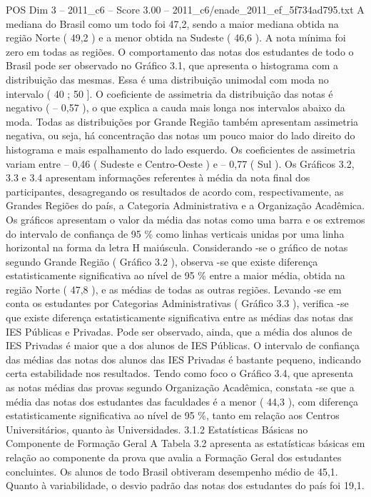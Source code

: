 \begin{textsample}{POS Dim 3 – 2011\_c6 – Score 3.00 – 2011\_c6/enade\_2011\_ef\_5f734ad795.txt}
A mediana do Brasil como um todo foi 47,2, sendo a maior mediana obtida na região Norte ( 49,2 ) e a menor obtida na Sudeste ( 46,6 ).
A nota mínima foi zero em todas as regiões.
O comportamento das notas dos estudantes de todo o Brasil pode ser observado no Gráfico 3.1, que apresenta o histograma com a distribuição das mesmas.
Essa é uma distribuição unimodal com moda no intervalo ( 40 ; 50 ].
O coeficiente de assimetria da distribuição das notas é negativo ( – 0,57 ), o que explica a cauda mais longa nos intervalos abaixo da moda.
Todas as distribuições por Grande Região também apresentam assimetria negativa, ou seja, há concentração das notas um pouco maior do lado direito do histograma e mais espalhamento do lado esquerdo.
Os coeficientes de assimetria variam entre – 0,46 ( Sudeste e Centro-Oeste ) e – 0,77 ( Sul ).
Os Gráficos 3.2, 3.3 e 3.4 apresentam informações referentes à média da nota final dos participantes, desagregando os resultados de acordo com, respectivamente, as Grandes Regiões do país, a Categoria Administrativa e a Organização Acadêmica.
Os gráficos apresentam o valor da média das notas como uma barra e os extremos do intervalo de confiança de 95 \% como linhas verticais unidas por uma linha horizontal na forma da letra H maiúscula.
Considerando -se o gráfico de notas segundo Grande Região ( Gráfico 3.2 ), observa -se que existe diferença estatisticamente significativa ao nível de 95 \% entre a maior média, obtida na região Norte ( 47,8 ), e as médias de todas as outras regiões.
Levando -se em conta os estudantes por Categorias Administrativas ( Gráfico 3.3 ), verifica -se que existe diferença estatisticamente significativa entre as médias das notas das IES Públicas e Privadas.
Pode ser observado, ainda, que a média dos alunos de IES Privadas é maior que a dos alunos de IES Públicas.
O intervalo de confiança das médias das notas dos alunos das IES Privadas é bastante pequeno, indicando certa estabilidade nos resultados.
Tendo como foco o Gráfico 3.4, que apresenta as notas médias das provas segundo Organização Acadêmica, constata -se que a média das notas dos estudantes das faculdades é a menor ( 44,3 ), com diferença estatisticamente significativa ao nível de 95 \%, tanto em relação aos Centros Universitários, quanto às Universidades. 3.1.2 Estatísticas Básicas no Componente de Formação Geral A Tabela 3.2 apresenta as estatísticas básicas em relação ao componente da prova que avalia a Formação Geral dos estudantes concluintes.
Os alunos de todo Brasil obtiveram desempenho médio de 45,1.
Quanto à variabilidade, o desvio padrão das notas dos estudantes do país foi 19,1.

\end{textsample}
